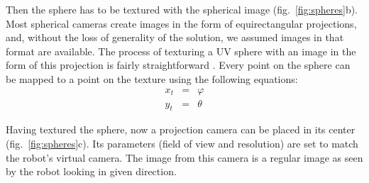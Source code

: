 \documentclass{svproc}
\begin{document}
Then the sphere has to be textured with the spherical image (fig.~\ref{fig:spheres}b).
Most spherical cameras create images in the form of equirectangular projections, and, without the loss
of generality of the solution, we assumed images in that format are available.
The process of texturing a UV sphere with an image in the form of this projection is fairly straightforward \cite{greene1986environment}. 
Every point on the sphere can be mapped to a point on the texture using the following equations:
\begin{eqnarray}
    x_t &=& \varphi \nonumber \\
    y_t &=& \theta
\end{eqnarray}

Having textured the sphere, now a projection camera can be placed in its center (fig.~\ref{fig:spheres}c).
Its parameters (field of view and resolution) are set to match the robot's virtual camera.
The image from this camera is a regular image as seen by the robot looking in given direction.
\end{document}
